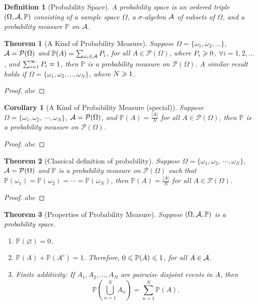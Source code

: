 \documentclass[openany,12pt]{book}
\newtheorem{theorem}{Theorem}[chapter]
\newtheorem{corollary}{Corollary}[chapter]
\newtheorem{definition}{Definition}[chapter]
\begin{document}
\begin{definition}[Probability Space]
  A probability space is an ordered triple $(\Omega,\mathcal{A},\mathbb{P})$ consisting of a sample space $\Omega$, a $\sigma$-algebra $\mathcal{A}$  of subsets of $\Omega$, and a probability measure $\mathbb{P}$ on $\mathcal{A}$.
\end{definition}

\begin{theorem}[A Kind of Probability Measure]
  Suppose $\Omega=\{\omega_1,\omega_2,\dots\}$, $\mathcal{A}=\mathcal{P}(\Omega)$ and $\mathbb{P}(A)=\sum_{\omega_i\in\mathcal{A}}P_i$, for all $A\in\mathcal{P}(\Omega)$, where $P_i\geqslant0$, $\forall i=1,2,\dots$, and $\sum_{i=1}^{\infty} P_i =1$, then $\mathbb{P}$ is a probability measure on $\mathcal{P}(\Omega)$. A similar result holds if $\Omega=\{\omega_1,\omega_2,\dots,\omega_N\}$, where $N\geqslant1$.
\end{theorem}

\begin{proof}
  abc
\end{proof}

\begin{corollary}[A Kind of Probability Measure (special)]
  Suppose $\Omega=\{\omega_1,\omega_2,\ \cdots,\omega_N\}$, $\mathcal{A}=\mathcal{P}(\Omega)$, and $\mathbb{P}(A)=\frac{|A|}{N}$ for all $A\in\mathcal{P}(\Omega)$, then $\mathbb{P}$ is a probability measure on $\mathcal{P}(\Omega)$.
\end{corollary}

\begin{proof}
  abc
\end{proof}

\begin{theorem}[Classical definition of probability]
  Suppose $\Omega=\{\omega_1,\omega_2,\ \cdots,\omega_N\}$, $\mathcal{A}=\mathcal{P}(\Omega)$ and $\mathbb{P}$ is a probability measure on $\mathcal{P}(\Omega)$ such that $\mathbb{P}({\omega_1})=\mathbb{P}({\omega_2})=\cdots=\mathbb{P}({\omega_N})$, then $\mathbb{P}(A)=\frac{|A|}{N}$ for all $A\in\mathcal{P}(\Omega)$.
\end{theorem}

\begin{proof}
  abc
\end{proof}

\begin{theorem}[Properties of Probability Measure]
  Suppose $(\Omega,\mathcal{A},\mathbb{P})$ is a probability space.
  \begin{enumerate}
    \item $\mathbb{P}(\varnothing)=0$.
    \item $\mathbb{P}(A)+\mathbb{P}(A^c)=1$. Therefore, $0\leqslant\mathbb{P}(A)\leqslant1$, for all $A\in\mathcal{A}$.
    \item Finite additivity: If $A_1,A_2,\dots,A_N$ are pairwise disjoint events in $A$, then $$\mathbb{P}\left(\bigcup_{n=1}^NA_n \right)=\sum_{n=1}^N\mathbb{P}(A).$$
  \end{enumerate}
\end{theorem}
\end{document}

